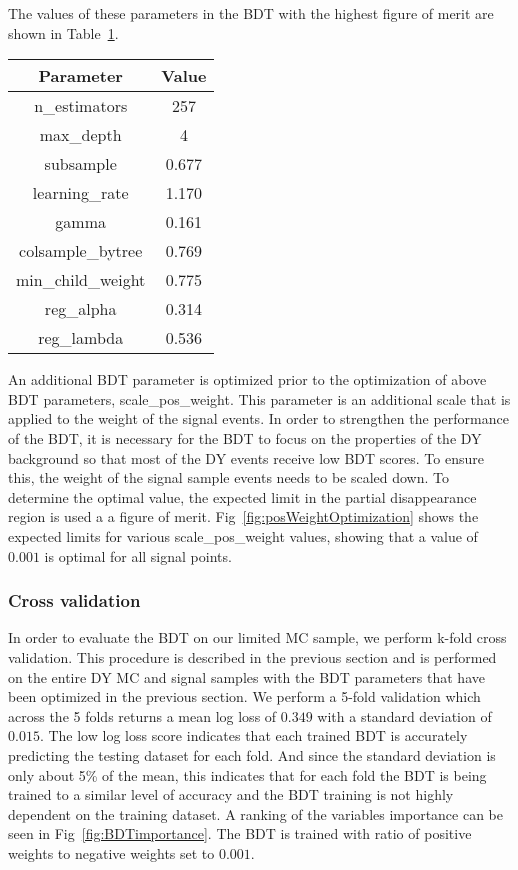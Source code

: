 The values of these parameters in the BDT with the highest figure of merit are shown in Table~\ref{tab:BDTparameters}.
\begin{table}[htbp]
  \centering
  \label{tab:BDTparameters}
    \begin{tabular}{ c c }
\hline
Parameter & Value \\
\hline
n\_estimators & 257 \\
max\_depth & 4 \\
subsample & 0.677 \\
learning\_rate & 1.170 \\
gamma & 0.161\\
colsample\_bytree & 0.769 \\
min\_child\_weight & 0.775\\
reg\_alpha & 0.314\\
reg\_lambda & 0.536\\
\hline
    \end{tabular}
\end{table}
An additional BDT parameter is optimized prior to the optimization of above BDT parameters, scale\_pos\_weight. This parameter is an additional scale that is applied to the weight of the signal events.
In order to strengthen the performance of the BDT, it is necessary for the BDT to focus on the properties of the DY background so that most of the DY events receive low BDT scores.
To ensure this, the weight of the signal sample events needs to be scaled down. To determine the optimal value, the expected limit in the partial disappearance region is used a a figure of merit.
Fig~\ref{fig:posWeightOptimization} shows the expected limits for various scale\_pos\_weight values, showing that a value of $0.001$ is optimal for all signal points.
\subsubsection*{Cross validation}

In order to evaluate the BDT on our limited MC sample, we perform k-fold cross validation.
This procedure is described in the previous section and is performed on the entire DY MC and signal samples with the BDT parameters that have been optimized in the previous section.
We perform a 5-fold validation which across the 5 folds returns a mean log loss of $0.349$ with a standard deviation of $0.015$.
The low log loss score indicates that each trained BDT is accurately predicting the testing dataset for each fold.
And since the standard deviation is only about 5\% of the mean, this indicates that for each fold the BDT is being trained to a similar level of accuracy and the BDT training is not highly dependent on the training dataset.
A ranking of the variables importance can be seen in Fig~\ref{fig:BDTimportance}. The BDT is trained with ratio of positive weights to negative weights set to $0.001$.
